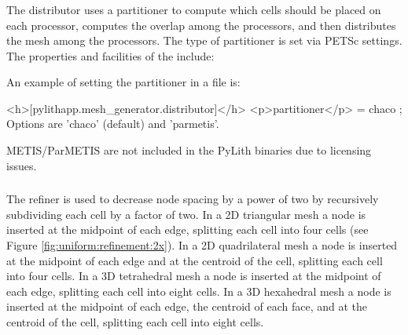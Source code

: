 
\subsubsection{}

The distributor uses a partitioner to compute which cells should be
placed on each processor, computes the overlap among the processors,
and then distributes the mesh among the processors. The type of
partitioner is set via PETSc settings. The properties and facilities
of the  include:
\begin{inventory}
\end{inventory}
An example of setting the partitioner in a 
  file is:
\begin{cfg}
<h>[pylithapp.mesh_generator.distributor]</h>
<p>partitioner</p> = chaco ; Options are 'chaco' (default) and 'parmetis'.
\end{cfg}
METIS/ParMETIS are not included in the PyLith binaries due to licensing
issues. 


\subsubsection{}

The refiner is used to decrease node spacing by a power of two by
recursively subdividing each cell by a factor of two. In a 2D triangular
mesh a node is inserted at the midpoint of each edge, splitting each
cell into four cells (see Figure \vref{fig:uniform:refinement:2x}).
In a 2D quadrilateral mesh a node is inserted at the midpoint of each
edge and at the centroid of the cell, splitting each cell into four
cells. In a 3D tetrahedral mesh a node is inserted at the midpoint
of each edge, splitting each cell into eight cells. In a 3D hexahedral
mesh a node is inserted at the midpoint of each edge, the centroid
of each face, and at the centroid of the cell, splitting each cell
into eight cells.

